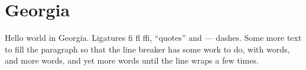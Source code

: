 \documentclass{article}
\begin{document}
\section{Georgia}
Hello world in Georgia. Ligatures fi fl ffi, “quotes” and — dashes.
Some more text to fill the paragraph so that the line breaker has some work to do,
with words, and more words, and yet more words until the line wraps a few times.
\end{document}
